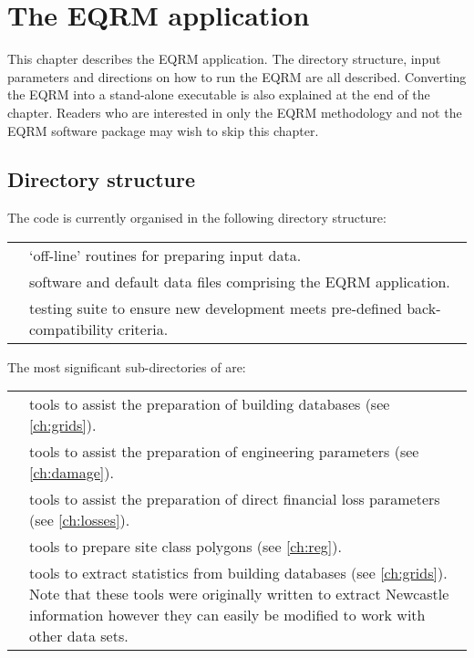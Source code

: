 \chapter{The EQRM application}
\label{ch:application}

This chapter describes the EQRM application. The directory
structure, input parameters and directions on how to run the EQRM
are all described. Converting the EQRM into a stand-alone
executable is also explained at the end of the chapter. Readers
who are interested in only the EQRM methodology and not the EQRM
software package may wish to skip this chapter.


\section{Directory structure}
\label{sec:app-dirstruct}

The code is currently organised in the following directory
structure:

\begin{supertabular}{lp{0.6\textwidth}}
  & `off-line' routines for
preparing input data. \\
 & software and default data files
comprising the EQRM application. \\
 & testing suite to
ensure new development meets pre-defined back-compatibility criteria. \\
\end{supertabular}

\vspace{2em}

The most significant sub-directories of
 are:

\begin{supertabular}{lp{0.7\textwidth}}
 & tools to assist the preparation of building databases (see \cref{ch:grids}).\\
 & tools to assist the preparation of engineering parameters (see \cref{ch:damage}).\\
 & tools to assist the preparation of direct financial loss parameters  (see \cref{ch:losses}). \\
 & tools to prepare site class polygons (see \cref{ch:reg}). \\
 & tools to extract statistics from building databases (see \cref{ch:grids}). Note that these tools were originally written to extract Newcastle information however they can easily be modified to work with other data sets. \\
\end{supertabular}

